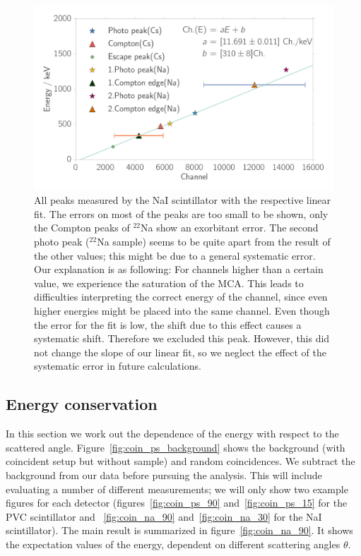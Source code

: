 \begin{figure}[htpb]
    \centering
    \includegraphics[width=0.9\linewidth]{./analysis/figures/calibration_na_linear_fit}
    \caption{All peaks measured by the NaI scintillator with the respective linear fit. The errors on 
        most of the peaks are too small to be shown, only the Compton peaks of $^{22}$Na show
        an exorbitant error. The second photo peak ($^{22}$Na sample) seems to be quite apart from
    the result of the other values; this might be due to a general systematic error. Our explanation is as following: 
    For channels higher than a certain value, we experience the saturation of the MCA. This leads to difficulties 
    interpreting the correct energy of the channel, 
    since even higher energies might be placed into the same channel. Even though the error for the
    fit is low, the shift due to this effect causes a systematic shift. Therefore we excluded this peak. However, 
    this did not change the slope of our linear fit, 
    so we neglect the effect of the systematic error in future calculations. }
    \label{fig:calibration_na_linear_fit}
\end{figure}

\clearpage
\subsection{Energy conservation}
\label{sub:energy_conservation}
In this section we work out the dependence of the energy with respect to the scattered
angle. Figure~\ref{fig:coin_ps_background} shows the background (with
coincident setup but without sample) and random coincidences.
We subtract the background from our data before pursuing the analysis.
This will include evaluating a number of different measurements; we will
only show two example figures for each detector 
(figures~\ref{fig:coin_ps_90} and~\ref{fig:coin_ps_15} for the PVC scintillator and 
~\ref{fig:coin_na_90} and~\ref{fig:coin_na_30} for the NaI scintillator). The main
result is summarized in figure~\ref{fig:coin_na_90}. It shows the expectation values of
the energy, dependent on different scattering angles $\theta$.


